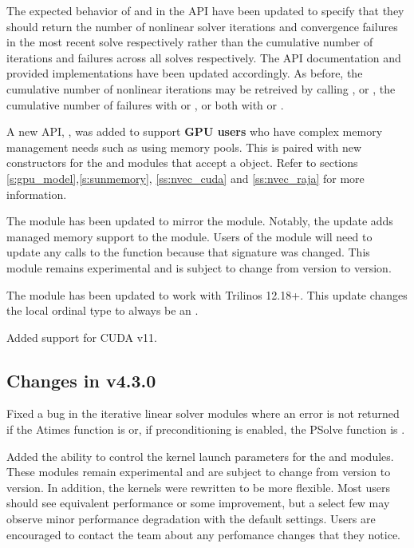 The expected behavior of  and
 in the {\sunnonlinsol} API have been updated to
specify that they should return the number of nonlinear solver iterations and
convergence failures in the most recent solve respectively rather than the
cumulative number of iterations and failures across all solves respectively. The
API documentation and {\sundials} provided {\sunnonlinsol} implementations have
been updated accordingly. As before, the cumulative number of nonlinear
iterations may be retreived by calling ,
or , the cumulative number of failures with
 or , or
both with  or .

A new API, , was added to support \textbf{GPU users} who
have complex memory management needs such as using memory pools. This is paired
with new constructors for the {\nveccuda} and {\nvecraja} modules that accept a
 object. Refer to sections
\ref{s:gpu_model},\ref{s:sunmemory}, \ref{ss:nvec_cuda} and \ref{ss:nvec_raja}
for more information.

The  module has been updated to mirror the  module.
Notably, the update adds managed memory support to the  module.
Users of the module will need to update any calls to the  function
because that signature was changed. This module remains experimental and is
subject to change from version to version.

The  module has been updated to work with Trilinos 12.18+.
This update changes the local ordinal type to always be an .

Added support for CUDA v11.


\subsection*{Changes in v4.3.0}

Fixed a bug in the iterative linear solver modules where an error is not
returned if the Atimes function is  or, if preconditioning is enabled,
the PSolve function is .

Added the ability to control the {\cuda} kernel launch parameters for the
 and  modules. These modules remain
experimental and are subject to change from version to version.
In addition, the  kernels were rewritten to be more flexible.
Most users should see equivalent performance or some improvement, but a select
few may observe minor performance degradation with the default settings. Users
are encouraged to contact the {\sundials} team about any perfomance changes
that they notice.

